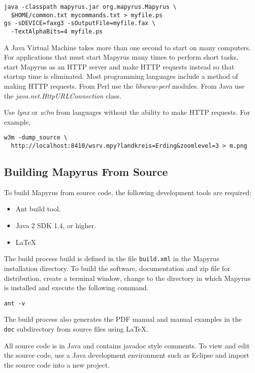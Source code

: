 \begin{verbatim}
java -classpath mapyrus.jar org.mapyrus.Mapyrus \
  $HOME/common.txt mycommands.txt > myfile.ps
gs -sDEVICE=faxg3 -sOutputFile=myfile.fax \
  -TextAlphaBits=4 myfile.ps
\end{verbatim}

A Java Virtual Machine takes more than one second to start on many computers.
For applications that must start Mapyrus many times to perform short tasks,
start Mapyrus as an HTTP server and make HTTP requests instead so that
startup time is eliminated.
Most programming languages include a method of making HTTP requests.
From Perl use the \textit{libwww-perl} modules.
From Java use the \textit{java.net.HttpURLConnection} class.

Use \textit{lynx} or \textit{w3m} from languages without the ability to make
HTTP requests.  For example,

\begin{verbatim}
w3m -dump_source \
  http://localhost:8410/wsrv.mpy?landkreis=Erding&zoomlevel=3 > m.png
\end{verbatim}

\subsection{Building Mapyrus From Source}

To build Mapyrus from source code, the following development tools
are required:

\begin{itemize}
\item
Ant build tool.
\item
Java 2 SDK 1.4, or higher.
\item
\LaTeX
\end{itemize}

The build process build is defined in the file \texttt{build.xml} in the
Mapyrus installation directory.  To build the software, documentation and zip
file for distribution, create a terminal window, change to the directory in
which Mapyrus is installed and execute the following command.

\begin{verbatim}
ant -v
\end{verbatim}

The build process also generates the PDF manual and manual examples in the
\texttt{doc} subdirectory from source files using \LaTeX.

All source code is in Java and contains javadoc style comments.  To view and
edit the source code, use a Java development environment such as Eclipse and
import the source code into a new project.

